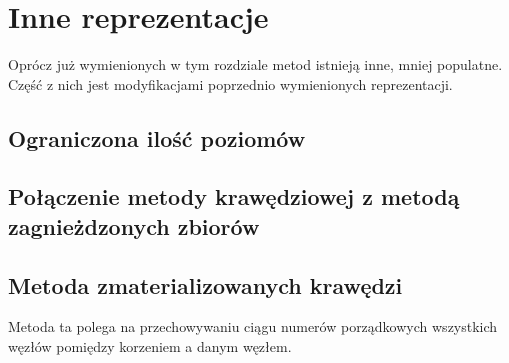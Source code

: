 \section{Inne reprezentacje}

Oprócz już wymienionych w tym rozdziale metod istnieją inne, mniej populatne.
Część z nich jest modyfikacjami poprzednio wymienionych reprezentacji.

\subsection{Ograniczona ilość poziomów}

\subsection{Połączenie metody krawędziowej z metodą zagnieżdzonych zbiorów}

\subsection{Metoda zmaterializowanych krawędzi}

Metoda ta polega na przechowywaniu ciągu numerów porządkowych wszystkich węzłów pomiędzy korzeniem a danym węzłem.




